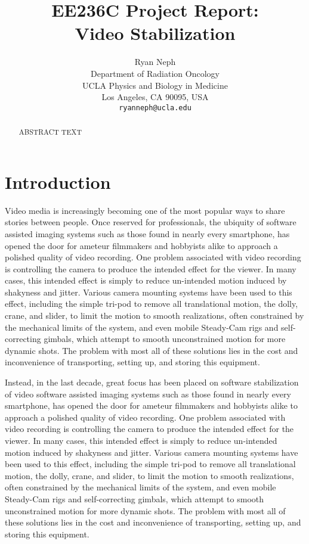 \documentclass{article} %
\title{EE236C Project Report:\\Video Stabilization}
\author{Ryan Neph \\
Department of Radiation Oncology \\
UCLA Physics and Biology in Medicine \\
Los Angeles, CA 90095, USA \\
\texttt{ryanneph@ucla.edu} \\
}
\begin{document}
\maketitle

\begin{abstract}
  ABSTRACT TEXT
\end{abstract}

\section{Introduction}
Video media is increasingly becoming one of the most popular ways to share stories between people. Once reserved for professionals, the ubiquity of software assisted imaging systems such as those found in nearly every smartphone, has opened the door for ameteur filmmakers and hobbyists alike to approach a polished quality of video recording. One problem associated with video recording is controlling the camera to produce the intended effect for the viewer. In many cases, this intended effect is simply to reduce un-intended motion induced by shakyness and jitter. Various camera mounting systems have been used to this effect, including the simple tri-pod to remove all translational motion, the dolly, crane, and slider, to limit the motion to smooth realizations, often constrained by the mechanical limits of the system, and even mobile Steady-Cam rigs and self-correcting gimbals, which attempt to smooth unconstrained motion for more dynamic shots. The problem with most all of these solutions lies in the cost and inconvenience of transporting, setting up, and storing this equipment.

Instead, in the last decade, great focus has been placed on software stabilization of video software assisted imaging systems such as those found in nearly every smartphone, has opened the door for ameteur filmmakers and hobbyists alike to approach a polished quality of video recording. One problem associated with video recording is controlling the camera to produce the intended effect for the viewer. In many cases, this intended effect is simply to reduce un-intended motion induced by shakyness and jitter. Various camera mounting systems have been used to this effect, including the simple tri-pod to remove all translational motion, the dolly, crane, and slider, to limit the motion to smooth realizations, often constrained by the mechanical limits of the system, and even mobile Steady-Cam rigs and self-correcting gimbals, which attempt to smooth unconstrained motion for more dynamic shots. The problem with most all of these solutions lies in the cost and inconvenience of transporting, setting up, and storing this equipment.
\end{document}
